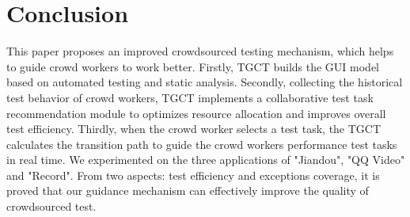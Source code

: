 \section{Conclusion}
This paper proposes an improved crowdsourced testing mechanism, which helps to guide crowd workers to work better. Firstly, TGCT builds the GUI model based on automated testing and static analysis. Secondly, collecting the historical test behavior of crowd workers, TGCT implements a collaborative test task recommendation module to optimizes resource allocation and improves overall test efficiency. Thirdly, when the crowd worker selects a test task, the TGCT calculates the transition path to guide the crowd workers performance test tasks in real time. We experimented on the three applications of "Jiandou", "QQ Video" and "Record". From two aspects: test efficiency and exceptions coverage, it is proved that our guidance mechanism can effectively improve the quality of crowdsourced test.
